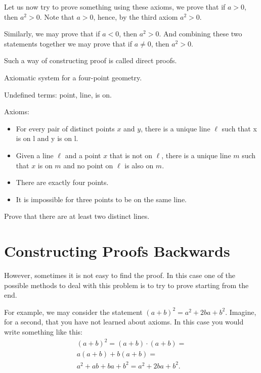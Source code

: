 Let us now try to prove something using these axioms, we prove that if $a > 0$,
then $a^2 > 0$. Note that $a > 0$, hence, by the third axiom $a^2 > 0$.

Similarly, we may prove that if $a < 0$, then $a^2 > 0$. And combining these
two statements together we may prove that if $a \neq 0$, then $a^2 > 0$.

Such a way of constructing proof is called direct proofs.

\begin{exercise}
  Axiomatic system for a four-point geometry.

  Undefined terms: point, line, is on.

  Axioms:
  \begin{itemize}
    \item For every pair of distinct points $x$ and $y$, there is a unique line
      $\ell$ such that x is on l and y is on l.
    \item Given a line $\ell$ and a point $x$ that is not on $\ell$, there is a
      unique line $m$ such that $x$ is on $m$ and no point on $\ell$ is also on
      $m$.
    \item There are exactly four points.
    \item It is impossible for three points to be on the same line.
  \end{itemize}
  Prove that there are at least two distinct lines.
\end{exercise}

\section{Constructing Proofs Backwards}
However, sometimes it is not easy to find the proof. In this case one of the
possible methods to deal with this problem is to try to prove starting from
the end.

For example, we may consider the statement $(a + b)^2 = a^2 + 2ba + b^2$.
Imagine, for a second, that you have not learned about axioms.
In this case you would write something like this:
\begin{multline*}
    (a + b)^2 = (a + b) \cdot (a + b) = \\
    a (a + b) + b (a + b) = \\
    a^2 + ab + ba + b^2 = a^2 + 2ba + b^2.
\end{multline*}


